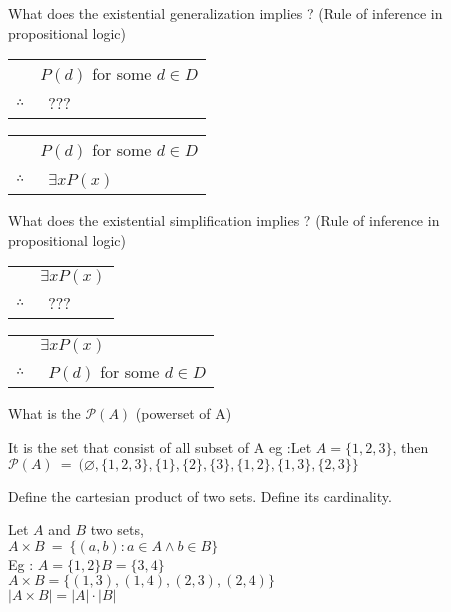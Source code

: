 \documentclass[12pt]{article}
\newcommand*{\xfield}[1]{\begin{mdframed}\centering #1\end{mdframed}\bigskip}
\newenvironment{note}{}{}
\begin{document}
\begin{note}
    \xfield{
        What does the existential generalization implies ? (Rule of inference in propositional logic) \begin{tabular}{c@{\,}l@{}}
        & $P(d)$ for some $d \in D$ \\\cline{2-2}    $\therefore$         & \ ??? \\  \end{tabular}
    }
    \xfield{ \begin{tabular}{c@{\,}l@{}}& $P(d)$ for some $d \in D$ \\\cline{2-2}    $\therefore$         & \ $\exists x P(x)$ \\  \end{tabular}}
\end{note}

\begin{note}
    \xfield{
        What does the existential simplification implies ? (Rule of inference in propositional logic) \begin{tabular}{c@{\,}l@{}}
        & $\exists x P(x)$ \\\cline{2-2}    $\therefore$         & \ ??? \\  \end{tabular}
    }
    \xfield{ \begin{tabular}{c@{\,}l@{}}& $\exists x P(x)$ \\\cline{2-2}    $\therefore$         & \  $P(d)$ for some $d \in D$ \\  \end{tabular}}
\end{note}

\begin{note}
    \xfield{What is the $\mathcal P \left({A}\right)$ (powerset of A)}
    \xfield{It is the set that consist of all subset of A eg :Let $A = \{1,2,3\}$, then $\mathcal P \left({A}\right)\ =\ (\varnothing,\{1,2,3\},\{1\},\{2\},\{3\},\{1,2\},\{1,3\},\{2,3\}\}$}
\end{note}

\begin{note}
    \xfield{
        Define the cartesian product of two sets.
        Define its cardinality.
    }
    \xfield{
        Let $A$ and $B$ two sets,\\
        $A \times B\ =\ \{(a,b) : a \in A \wedge b \in B\}$\\
        Eg : $A =\{1,2\} B = \{3,4\}$\\
        $A \times B = \{(1,3),(1,4),(2,3),(2,4)\}$\\
        $\left\vert A \times B\right\vert = \left\vert A \right\vert \cdot \left\vert B \right\vert $
    }
\end{note}
\end{document}
